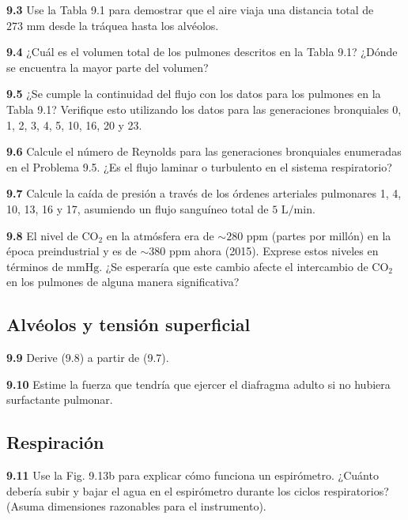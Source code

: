 \documentclass[12pt]{book}
\begin{document}
\noindent \textbf{9.3} Use la Tabla 9.1 para demostrar que el aire viaja una distancia total de $273\text{ mm}$ desde la tráquea hasta los alvéolos.

\noindent \textbf{9.4} ¿Cuál es el volumen total de los pulmones descritos en la Tabla 9.1? ¿Dónde se encuentra la mayor parte del volumen?

\noindent \textbf{9.5} ¿Se cumple la continuidad del flujo con los datos para los pulmones en la Tabla 9.1? Verifique esto utilizando los datos para las generaciones bronquiales 0, 1, 2, 3, 4, 5, 10, 16, 20 y 23.

\noindent \textbf{9.6} Calcule el número de Reynolds para las generaciones bronquiales enumeradas en el Problema 9.5. ¿Es el flujo laminar o turbulento en el sistema respiratorio?

\noindent \textbf{9.7} Calcule la caída de presión a través de los órdenes arteriales pulmonares 1, 4, 10, 13, 16 y 17, asumiendo un flujo sanguíneo total de $5\text{ L/min}$.

\noindent \textbf{9.8} El nivel de $\text{CO}_2$ en la atmósfera era de $\sim 280\text{ ppm}$ (partes por millón) en la época preindustrial y es de $\sim 380\text{ ppm}$ ahora (2015). Exprese estos niveles en términos de $\text{mmHg}$. ¿Se esperaría que este cambio afecte el intercambio de $\text{CO}_2$ en los pulmones de alguna manera significativa?

\subsection*{Alvéolos y tensión superficial}

\noindent \textbf{9.9} Derive (9.8) a partir de (9.7).

\noindent \textbf{9.10} Estime la fuerza que tendría que ejercer el diafragma adulto si no hubiera surfactante pulmonar.

\subsection*{Respiración}

\noindent \textbf{9.11} Use la Fig. 9.13b para explicar cómo funciona un espirómetro. ¿Cuánto debería subir y bajar el agua en el espirómetro durante los ciclos respiratorios? (Asuma dimensiones razonables para el instrumento).
\end{document}
